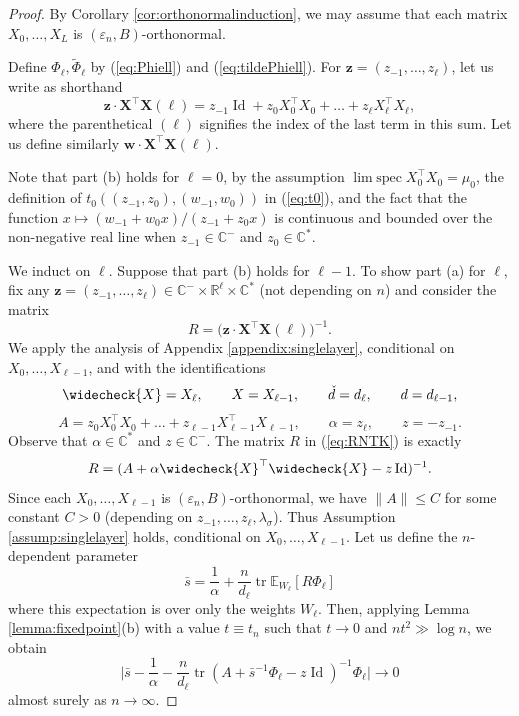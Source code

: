 \documentclass{article}
\theoremstyle{definition}
\newcommand{\R}{\mathbb{R}}
\newcommand{\C}{\mathbb{C}}
\newcommand{\E}{\mathbb{E}}
\newcommand{\Id}{\operatorname{Id}}
\newcommand{\tr}{\operatorname{tr}}
\newcommand{\z}{\mathbf{z}}
\newcommand{\w}{\mathbf{w}}
\newcommand{\eps}{\varepsilon}
\newcommand{\vd}{\check{d}}
\newcommand{\vX}{\widecheck{X}}
\newcommand{\bX}{\mathbf{X}}
\newcommand{\1}{\mathbf{1}}
\newcommand{\limspec}{\operatorname{lim\;spec}}
\begin{document}
\begin{proof}
By Corollary \ref{cor:orthonormalinduction}, we may assume that each matrix
$X_0,\ldots,X_L$ is $(\eps_n,B)$-orthonormal.

Define $\Phi_\ell,\tilde{\Phi}_\ell$ by (\ref{eq:Phiell}) and
(\ref{eq:tildePhiell}). For $\z=(z_{-1},\ldots,z_\ell)$, let us write as
shorthand
\[\z \cdot \bX^\top \bX(\ell)
=z_{-1}\Id+z_0X_0^\top X_0+\ldots+z_\ell X_\ell^\top X_\ell,\]
where the parenthetical $(\ell)$ signifies the index of the last term in this
sum. Let us define similarly $\w \cdot \bX^\top \bX(\ell)$.

Note that part (b) holds for $\ell=0$, by 
the assumption $\limspec X_0^\top X_0=\mu_0$,
the definition of $t_0((z_{-1},z_0),(w_{-1},w_0))$ in (\ref{eq:t0}),
and the fact that the function $x
\mapsto (w_{-1}+w_0x)/(z_{-1}+z_0x)$ is continuous and bounded over the
non-negative real line when $z_{-1} \in \C^-$ and $z_0 \in \C^*$.

We induct on $\ell$. Suppose that part (b) holds for $\ell-1$. 
To show part (a) for $\ell$, fix any
$\z=(z_{-1},\ldots,z_\ell) \in \C^- \times \R^\ell \times \C^*$
(not depending on $n$) and consider the matrix
\begin{equation}\label{eq:RNTK}
R=\Big(\z \cdot \bX^\top \bX(\ell)\Big)^{-1}.
\end{equation}
We apply the analysis of Appendix \ref{appendix:singlelayer}, conditional on
$X_0,\ldots,X_{\ell-1}$, and with the identifications
\[\vX=X_\ell, \qquad X=X_{\ell-1}, \qquad \vd=d_\ell, \qquad d=d_{\ell-1},\]
\[A=z_0X_0^\top X_0+\ldots+z_{\ell-1}X_{\ell-1}^\top X_{\ell-1}, \qquad
\alpha=z_\ell, \qquad z=-z_{-1}.\]
Observe that $\alpha \in \C^*$ and $z \in \C^-$. The
matrix $R$ in (\ref{eq:RNTK}) is exactly
\[R=(A+\alpha \vX^\top \vX-z\Id)^{-1}.\]
Since each $X_0,\ldots,X_{\ell-1}$ is $(\eps_n,B)$-orthonormal, we have
$\|A\| \leq C$ for some constant $C>0$
(depending on $z_{-1},\ldots,z_\ell,\lambda_\sigma$).
Thus Assumption \ref{assump:singlelayer} holds, conditional on
$X_0,\ldots,X_{\ell-1}$. Let us define the $n$-dependent parameter
\[\bar{s}=\frac{1}{\alpha}+\frac{n}{d_\ell}\tr \E_{W_\ell}[R \Phi_\ell]\]
where this expectation is over only the weights $W_\ell$.
Then, applying Lemma \ref{lemma:fixedpoint}(b) with a
value $t \equiv t_n$ such that $t \to 0$ and $nt^2 \gg \log n$, we obtain
\begin{equation}\label{eq:fixedpointNTKbars}
\Big|\bar{s}-\frac{1}{\alpha}-\frac{n}{d_\ell}
\tr (A+\bar{s}^{-1}\Phi_\ell-z\Id)^{-1}\Phi_\ell\Big| \to 0
\end{equation}
almost surely as $n \to \infty$.


\end{proof}
\end{document}
